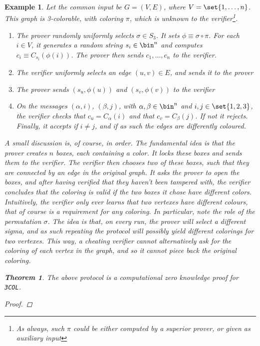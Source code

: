 \documentclass{article}
\newtheorem{theorem}{Theorem}
\newtheorem{example}{Example}
\begin{document}
\begin{example}
    Let the common input be $G = (V, E)$, where $V = \set{1, \dots, n }$.
    This graph is 3-colorable, with coloring $\pi$, which is unknown to the verifier\footnote{As always, such $\pi$ could be either computed by a superior prover, or given as auxiliary input}.
    \begin{enumerate}
        \item The prover randomly uniformly selects $\sigma \in S_3$. It sets $\phi \equiv \sigma \circ \pi$.
              For each $i \in V$, it generates a random string $s_i \in \bin^n$ and computes $c_i \equiv C_{s_i}(\phi(i))$.
              The prover then sends $c_1, \dots, c_n$ to the verifier.
        \item The verifier uniformly selects an edge $(u, v) \in E$, and sends it to the prover
        \item The prover sends $(s_u, \phi(u))$ and $(s_v, \phi(v))$ to the verifier
        \item On the messages $(\alpha, i)$, $(\beta, j)$, with $\alpha, \beta \in \bin^n$ and $i, j \in  \set{1, 2, 3}$, the verifier checks that $c_u = C_\alpha(i)$ and that
              $c_v = C_\beta(j)$. If not it rejects. Finally, it accepts if $i \neq j$, and if as such the edges are differently coloured.
    \end{enumerate}
    A small discussion is, of course, in order. The fundamental idea is that the prover creates $n$ boxes, each containing a color.
    It locks these boxes and sends them to the verifier. The verifier then chooses two of these boxes, such that they are connected by an edge in the original graph.
    It asks the prover to open the boxes, and after having verified that they haven't been tampered with, the verifier concludes that the coloring is valid if the two boxes it chose have different colors.
    Intuitively, the verifier only ever learns that two vertexes have different colours, that of course is a requirement for any coloring.
    In particular, note the role of the permutation $\sigma$. The idea is that, on every run, the prover will select a different sigma, and as such
    repeating the protocol will possibly yield different colorings for two vertexes. This way, a cheating verifier cannot alternatively ask for the coloring
    of each vertex in the graph, and so it cannot piece back the original coloring.
    \begin{theorem}
        The above protocol is a computational zero knowledge proof for \texttt{3COL}.
    \end{theorem}
    \begin{proof}

\end{proof}
\end{example}
\end{document}
